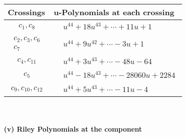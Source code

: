 \documentclass[1p]{elsarticle_modified}
\theoremstyle{definition}
\begin{document}
\begin{tabular}{m{50pt}|m{274pt}}
Crossings & \hspace{64pt}u-Polynomials at each crossing \\
\hline $$\begin{aligned}c_{1},c_{8}\end{aligned}$$&$\begin{aligned}
&u^{44}+18 u^{43}+\cdots+11 u+1
\end{aligned}$\\
\hline $$\begin{aligned}c_{2},c_{3},c_{6}\\c_{7}\end{aligned}$$&$\begin{aligned}
&u^{44}+9 u^{42}+\cdots-3 u+1
\end{aligned}$\\
\hline $$\begin{aligned}c_{4},c_{11}\end{aligned}$$&$\begin{aligned}
&u^{44}+3 u^{43}+\cdots-48 u-64
\end{aligned}$\\
\hline $$\begin{aligned}c_{5}\end{aligned}$$&$\begin{aligned}
&u^{44}-18 u^{43}+\cdots-28060 u+2284
\end{aligned}$\\
\hline $$\begin{aligned}c_{9},c_{10},c_{12}\end{aligned}$$&$\begin{aligned}
&u^{44}+5 u^{43}+\cdots-11 u-4
\end{aligned}$\\
\hline
\end{tabular}\\~\\
\newpage\renewcommand{\arraystretch}{1}
\flushleft \textbf{(v) Riley Polynomials at the component}\newline \\
\end{document}
